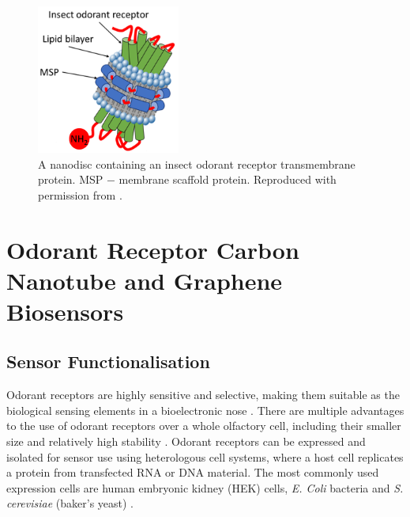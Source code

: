\documentclass[
  a4paper,
]{scrbook}
\begin{document}
\begin{figure}

{\centering \includegraphics[width=0.42\textwidth,height=\textheight]{figures/ch3/iOR_nanodisc.png}

}

\caption{\label{fig-msp-iOR-nanodisc}A nanodisc containing an insect
odorant receptor transmembrane protein. MSP \(-\) membrane scaffold
protein. Reproduced with permission from \autocite{Murugathas2019a}.}

\end{figure}

\hypertarget{odorant-receptor-carbon-nanotube-and-graphene-biosensors}{%
\section{Odorant Receptor Carbon Nanotube and Graphene
Biosensors}\label{odorant-receptor-carbon-nanotube-and-graphene-biosensors}}

\hypertarget{sec-sensor-types}{%
\subsection{Sensor Functionalisation}\label{sec-sensor-types}}

Odorant receptors are highly sensitive and selective, making them
suitable as the biological sensing elements in a bioelectronic nose
\autocite{Dung2018}. There are multiple advantages to the use of odorant
receptors over a whole olfactory cell, including their smaller size and
relatively high stability \autocite{Dung2018}. Odorant receptors can be
expressed and isolated for sensor use using heterologous cell systems,
where a host cell replicates a protein from transfected RNA or DNA
material. The most commonly used expression cells are human embryonic
kidney (HEK) cells, \emph{E. Coli} bacteria and \emph{S. cerevisiae}
(baker's yeast) \autocite{Dung2018}.
\end{document}
